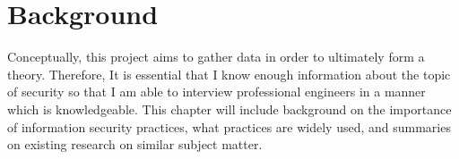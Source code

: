 \chapter{Background}\label{C:Background}

\par Conceptually, this project aims to gather data in order to ultimately form a theory. Therefore, It is essential that I know enough information about the topic of security so that I am able to interview professional engineers in a manner which is knowledgeable. This chapter will include background on the importance of information security practices, what practices are widely used, and summaries on existing research on similar subject matter. 
